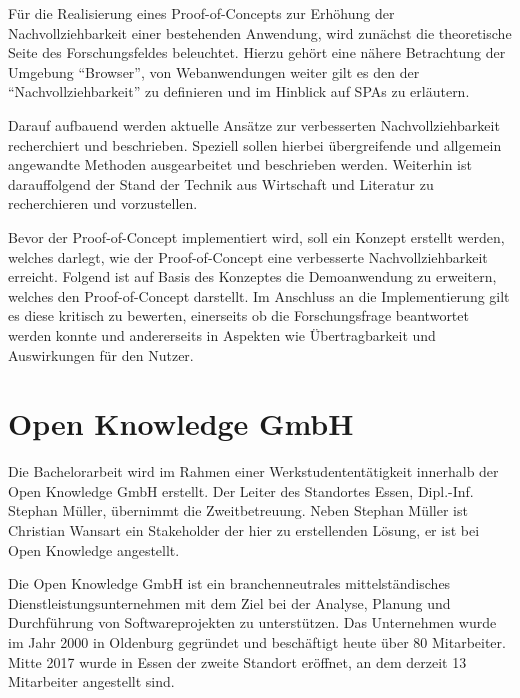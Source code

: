 \vspace{-0.25\baselineskip}

Für die Realisierung eines Proof-of-Concepts zur Erhöhung der Nachvollziehbarkeit einer bestehenden Anwendung, wird zunächst die theoretische Seite des Forschungsfeldes beleuchtet. Hierzu gehört eine nähere Betrachtung der Umgebung \enquote{Browser}, von Webanwendungen weiter gilt es den der \enquote{Nachvollziehbarkeit} zu definieren und im Hinblick auf SPAs zu erläutern.

Darauf aufbauend werden aktuelle Ansätze zur verbesserten Nachvollziehbarkeit recherchiert und beschrieben. Speziell sollen hierbei übergreifende und allgemein angewandte Methoden ausgearbeitet und beschrieben werden. Weiterhin ist darauffolgend der Stand der Technik aus Wirtschaft und Literatur zu recherchieren und vorzustellen.

Bevor der Proof-of-Concept implementiert wird, soll ein Konzept erstellt werden, welches darlegt, wie der Proof-of-Concept eine verbesserte Nachvollziehbarkeit erreicht. Folgend ist auf Basis des Konzeptes die Demoanwendung zu erweitern, welches den Proof-of-Concept darstellt. Im Anschluss an die Implementierung gilt es diese kritisch zu bewerten, einerseits ob die Forschungsfrage beantwortet werden konnte und andererseits in Aspekten wie Übertragbarkeit und Auswirkungen für den Nutzer.

\vspace{-0.25\baselineskip}

\section{Open Knowledge GmbH}

\vspace{-0.50\baselineskip}

Die Bachelorarbeit wird im Rahmen einer Werkstudententätigkeit innerhalb der Open Knowledge GmbH erstellt. Der Leiter des Standortes Essen, Dipl.-Inf. Stephan Müller, übernimmt die Zweitbetreuung. Neben Stephan Müller ist Christian Wansart ein Stakeholder der hier zu erstellenden Lösung, er ist bei Open Knowledge angestellt.

Die Open Knowledge GmbH ist ein branchenneutrales mittelständisches Dienstleistungsunternehmen mit dem Ziel bei der Analyse, Planung und Durchführung von Softwareprojekten zu unterstützen. Das Unternehmen wurde im Jahr 2000 in Oldenburg gegründet und beschäftigt heute über 80 Mitarbeiter. Mitte 2017 wurde in Essen der zweite Standort eröffnet, an dem derzeit 13 Mitarbeiter angestellt sind.

